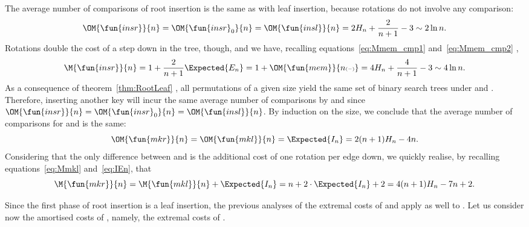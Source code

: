The average number of comparisons of root insertion is the same as
with leaf insertion, because rotations do not involve any comparison:
\begin{equation*}
\OM{\fun{insr}}{n} = \OM{\fun{insr}_0}{n} = \OM{\fun{insl}}{n}
= 2H_n + \frac{2}{n+1} - 3 \sim 2\ln n.
\index{insr@$\OM{\fun{insr}}{n}$}
\index{insr0@$\OM{\fun{insr}_0}{n}$}
\end{equation*}
Rotations double the cost of a step down in the tree, though, and we
have, recalling equations~\eqref{eq:Mmem_cmp1}
and~\eqref{eq:Mmem_cmp2} ,
\begin{equation*}
\M{\fun{insr}}{n} = 1 + \frac{2}{n+1}\Expected{E_n} = 1 +
\OM{\fun{mem}}{n{\scriptscriptstyle(-)}} = 4H_n + \frac{4}{n+1} - 3
\sim 4\ln n.
\index{insr@$\M{\fun{insr}}{n}$}
\end{equation*}
As a consequence of theorem~\eqref{thm:RootLeaf}
, all permutations of a given size yield the
same set of binary search trees under  and
. Therefore, inserting another key will incur the same
average number of comparisons by  and  since
\(\OM{\fun{insr}}{n} = \OM{\fun{insr}_0}{n} = \OM{\fun{insl}}{n}\). By
induction on the size, we conclude that the average number of
comparisons for  and  is the same:
\begin{equation*}
\OM{\fun{mkr}}{n} = \OM{\fun{mkl}}{n} = \Expected{I_n}
= 2(n+1)H_n - 4n.
\index{mkr@$\OM{\fun{mkr}}{n}$}
\end{equation*}
Considering that the only difference between  and
 is the additional cost of one rotation per edge down, we
quickly realise, by recalling equations~\eqref{eq:Mmkl}
and~\eqref{eq:IEn}, that
\begin{equation*}
\M{\fun{mkr}}{n} = \M{\fun{mkl}}{n} + \Expected{I_n}
= n + 2 \cdot \Expected{I_n} + 2 = 4(n+1)H_n - 7n + 2.
\index{mkr@$\M{\fun{mkr}}{n}$}
\end{equation*}


Since the first phase of root insertion is a leaf insertion, the
previous analyses of the extremal costs of  and
 apply as well to . Let us consider now
the amortised costs of , namely, the extremal costs of
.


